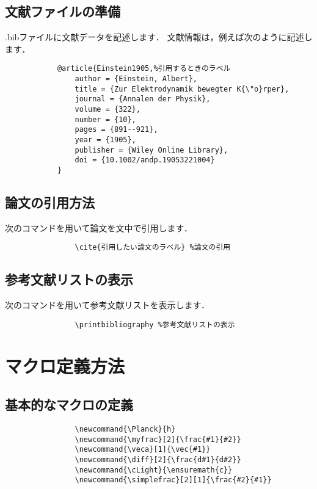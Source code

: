         \subsection{文献ファイルの準備}
        .bibファイルに文献データを記述します．
        文献情報は，例えば次のように記述します．
        \begin{verbatim}
            @article{Einstein1905,%引用するときのラベル
                author = {Einstein, Albert},
                title = {Zur Elektrodynamik bewegter K{\"o}rper},
                journal = {Annalen der Physik},
                volume = {322},
                number = {10},
                pages = {891--921},
                year = {1905},
                publisher = {Wiley Online Library},
                doi = {10.1002/andp.19053221004}
            }
        \end{verbatim}

        \subsection{論文の引用方法}
        次のコマンドを用いて論文を文中で引用します．
            \begin{verbatim}
                \cite{引用したい論文のラベル} %論文の引用
            \end{verbatim}

        \subsection{参考文献リストの表示}
        次のコマンドを用いて参考文献リストを表示します．
            \begin{verbatim}
                \printbibliography %参考文献リストの表示
            \end{verbatim}

    \section{マクロ定義方法}
        \subsection{基本的なマクロの定義}
            \begin{verbatim}
                \newcommand{\Planck}{h}
                \newcommand{\myfrac}[2]{\frac{#1}{#2}}
                \newcommand{\veca}[1]{\vec{#1}}
                \newcommand{\diff}[2]{\frac{d#1}{d#2}}
                \newcommand{\cLight}{\ensuremath{c}}
                \newcommand{\simplefrac}[2][1]{\frac{#2}{#1}}
            \end{verbatim}

